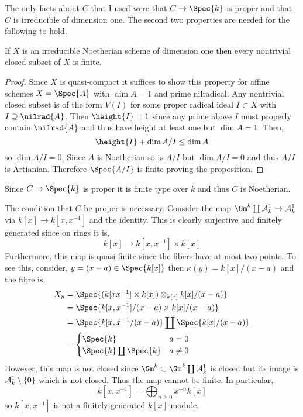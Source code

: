 \documentclass[12pt]{article}
\begin{document}
\begin{remark}
The only facts about $C$ that I used were that $C \to \Spec{k}$ is proper and that $C$ is irreducible of dimension one. The second two properties are needed for the following to hold.
\end{remark}

\begin{lemma}
If $X$ is an irreducible Noetherian scheme of dimension one then every nontrivial closed subset of $X$ is finite.
\end{lemma}

\begin{proof}
Since $X$ is quasi-compact it suffices to show this property for affine schemes $X = \Spec{A}$ with $\dim{A} = 1$ and prime nilradical. Any nontrivial closed subset is of the form $V(I)$ for some proper radical ideal $I \subset X$ with $I \supsetneq \nilrad{A}$. Then $\height{I} = 1$ since any prime above $I$ must properly contain $\nilrad{A}$ and thus have height at least one but $\dim{A} = 1$. Then,
\[ \height{I} + \dim{A / I} \le \dim{A} \]
so $\dim{A / I} = 0$. Since $A$ is Noetherian so is $A / I$ but $\dim{A / I} = 0$ and thus $A / I$ is Artianian. Therefore $\Spec{A / I}$ is finite proving the proposition. 
\end{proof}

\begin{remark}
Since $C \to \Spec{k}$ is proper it is finite type over $k$ and thus $C$ is Noetherian.
\end{remark}

\begin{rmk}
The condition that $C$ be proper is necessary.
Consider the map $\Gm^k \coprod \A^1_k \to \A^1_k$ via $k[x] \to k[x,x^{-1}]$ and the identity. This is clearly surjective and finitely generated since on rings it is,
\[ k[x] \to k[x, x^{-1}] \times k[x] \]
Furthermore, this map is quasi-finite since the fibers have at most two points. To see this, consider, $y = (x - a) \in \Spec{k[x]}$ then $\kappa(y) = k[x]/(x - a)$ and the fibre is,
\begin{align*}
X_y & = \Spec{(k[x x^{-1}] \times k[x]) \otimes_{k[x]} k[x]/(x  - a)} 
\\
& = \Spec{k[x, x^{-1}]/(x - a) \times k[x] / (x - a)} 
\\
& = \Spec{k[x, x^{-1}/(x - a)} \coprod \Spec{k[x]/(x - a)} 
\\
& = 
\begin{cases}
\Spec{k} & a = 0
\\
\Spec{k} \coprod \Spec{k} & a \neq 0
\end{cases}
\end{align*}
However, this map is not closed since $\Gm^k \subset \Gm^k \coprod \A^1_k$ is closed but its image is $\mathcal{A}^1_k \setminus \{ 0 \}$ which is not closed. Thus the map cannot be finite. In particular,
\[ k[x, x^{-1}] = \bigoplus_{n \ge 0} x^{-n} k[x] \]
so $k[x, x^{-1}]$ is not a finitely-generated $k[x]$-module.  
\end{rmk}
\end{document}
